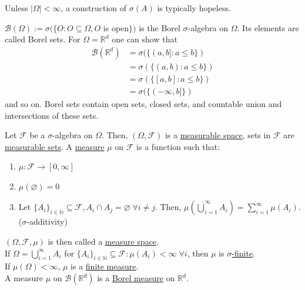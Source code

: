 \documentclass{article}
\begin{document}
	\begin{myrem}{}{}
		Unless $|\Omega|<\infty$, a construction of $\sigma(A)$ is typically hopeless.
	\end{myrem}
	
	\begin{myex}{}{}
		$\mathcal{B}(\Omega):=\sigma(\{O : O\subseteq\Omega, O$ is open$\})$ is the Borel $\sigma$-algebra on $\Omega$. Its elements are called Borel sets. For $\Omega=\mathbb{R}^d$ one can show that
		\begin{align*}
			\mathcal{B}(\mathbb{R}^d)&=\sigma(\{(a, b] : a\leq b\})\\
			&=\sigma(\{(a, b) : a\leq b\})\\
			&=\sigma(\{[a, b] : a\leq b\})\\
			&=\sigma(\{(-\infty, b]\})
		\end{align*}
		and so on. Borel sets contain open sets, closed sets, and countable union and intersections of these sets.
	\end{myex}
	
	\begin{mydef}{}{}
			Let $\mathcal{F}$ be a $\sigma$-algebra on $\Omega$. Then, $(\Omega, \mathcal{F})$ is a \underline{measurable space}, sets in $\mathcal{F}$ are \underline{measurable sets}. A \underline{measure} $\mu$ on $\mathcal{F}$ is a function such that:
			\begin{enumerate}[label=(\roman*)]
				\item $\mu : \mathcal{F}\rightarrow [0, \infty]$
				\item $\mu(\varnothing)=0$
				\item Let $\{A_i\}_{i\in\mathbb{N}}\subseteq\mathcal{F}, A_i\cap A_j=\varnothing\;\forall i\neq j$. Then, $\mu(\dot\bigcup_{i=1}^{\infty}A_i)=\sum_{i=1}^{\infty}\mu(A_i)$. ($\sigma$-additivity)
			\end{enumerate}
			
			$(\Omega, \mathcal{F}, \mu)$ is then called a \underline{measure space}.\\
			
			If $\Omega=\bigcup_{i=1}^{\infty}A_i$ for $\{A_i\}_{i\in\mathbb{N}}\subseteq\mathcal{F}: \mu(A_i)<\infty\;\forall i$, then $\mu$ is \underline{$\sigma$-finite}.\\
			
			If $\mu(\Omega)<\infty$, $\mu$ is a \underline{finite measure}.\\
			
			A measure $\mu$ on $\mathcal{B}(\mathbb{R}^d)$ is a \underline{Borel measure} on $\mathbb{R}^d$.
	\end{mydef}
	
\end{document}
